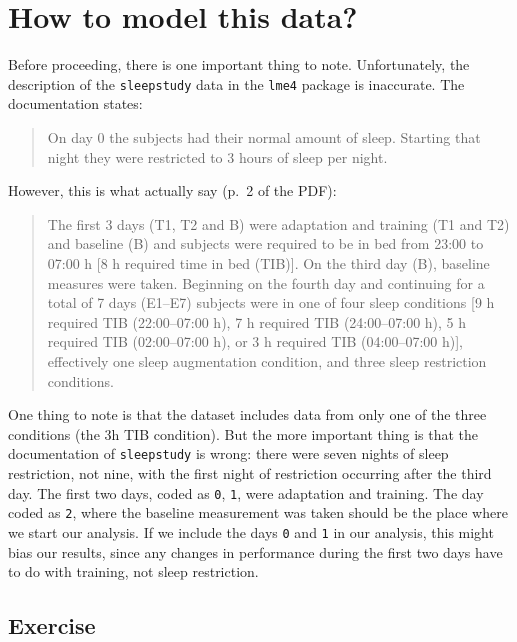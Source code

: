 \documentclass[]{book}
\begin{document}
\hypertarget{how-to-model-this-data}{%
\section{How to model this data?}\label{how-to-model-this-data}}

Before proceeding, there is one important thing to note. Unfortunately, the description of the \texttt{sleepstudy} data in the \texttt{lme4} package is inaccurate. The documentation states:

\begin{quote}
On day 0 the subjects had their normal amount of sleep. Starting that night they were restricted to 3 hours of sleep per night.
\end{quote}

However, this is what \citet{Belenky_et_al_2003} actually say (p.~2 of the PDF):

\begin{quote}
The first 3 days (T1, T2 and B) were adaptation and training (T1 and T2) and baseline (B) and subjects were required to be in bed from 23:00 to 07:00 h {[}8 h required time in bed (TIB){]}. On the third day (B), baseline measures were taken. Beginning on the fourth day and continuing for a total of 7 days (E1--E7) subjects were in one of four sleep conditions {[}9 h required TIB (22:00--07:00 h), 7 h required TIB (24:00--07:00 h), 5 h required TIB (02:00--07:00 h), or 3 h required TIB (04:00--07:00 h){]}, effectively one sleep augmentation condition, and three sleep restriction conditions.
\end{quote}

One thing to note is that the dataset includes data from only one of the three conditions (the 3h TIB condition). But the more important thing is that the documentation of \texttt{sleepstudy} is wrong: there were seven nights of sleep restriction, not nine, with the first night of restriction occurring after the third day. The first two days, coded as \texttt{0}, \texttt{1}, were adaptation and training. The day coded as \texttt{2}, where the baseline measurement was taken should be the place where we start our analysis. If we include the days \texttt{0} and \texttt{1} in our analysis, this might bias our results, since any changes in performance during the first two days have to do with training, not sleep restriction.

\hypertarget{exercise-1}{%
\subsection*{Exercise}\label{exercise-1}}
\end{document}

